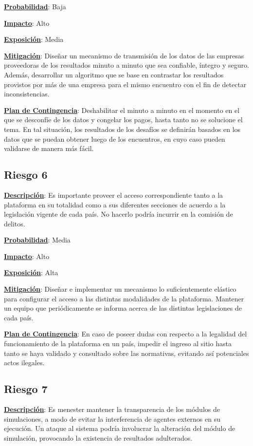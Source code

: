 \textbf{\underline{Probabilidad}}: Baja

\textbf{\underline{Impacto}}: Alto

\textbf{\underline{Exposición}}: Media

\textbf{\underline{Mitigación}}: Diseñar un mecanismo de transmisión de los datos de las empresas proveedoras de los resultados minuto a minuto que sea confiable, íntegro y seguro. Además, desarrollar un algoritmo que se base en contrastar los resultados provistos por más de una empresa para el mismo encuentro con el fin de detectar inconsistencias.

\textbf{\underline{Plan de Contingencia}}: Deshabilitar el minuto a minuto en el momento en el que se desconfíe de los datos y congelar los pagos, hasta tanto no se solucione el tema. En tal situación, los resultados de los desafíos se definirán basados en los datos que se puedan obtener luego de los encuentros, en cuyo caso pueden validarse de manera más fácil.


\subsection*{Riesgo 6}
\textbf{\underline{Descripción}}: Es importante proveer el acceso correspondiente tanto a la plataforma en su totalidad como a sus diferentes secciones de acuerdo a la legislación vigente de cada país. No hacerlo podría incurrir en la comisión de delitos.

\textbf{\underline{Probabilidad}}: Media

\textbf{\underline{Impacto}}: Alto

\textbf{\underline{Exposición}}: Alta

\textbf{\underline{Mitigación}}: Diseñar e implementar un mecanismo lo suficientemente elástico para configurar el acceso a las distintas modalidades de la plataforma. Mantener un equipo que periódicamente se informa acerca de las distintas legislaciones de cada país.

\textbf{\underline{Plan de Contingencia}}: En caso de poseer dudas con respecto a la legalidad del funcionamiento de la plataforma en un país, impedir el ingreso al sitio hasta tanto se haya validado y consultado sobre las normativas, evitando así potenciales actos ilegales.


\subsection*{Riesgo 7}
\textbf{\underline{Descripción}}: Es menester mantener la transparencia de los módulos de simulaciones, a modo de evitar la interferencia de agentes externos en su ejecución. Un ataque al sistema podría involucrar la alteración del módulo de simulación, provocando la existencia de resultados adulterados.


